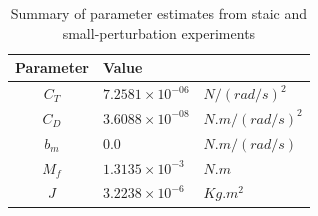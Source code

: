 \begin{table}[H]
    \centering
    \begin{tabular}{c l l}
        \hline \hline
        Parameter & Value & \\ \hline \hline
        $C_T$ & $7.2581 \times 10^{-06}$ & $N/(rad/s)^2$  \\
        $C_D$ & $3.6088 \times 10^{-08}$ & $N.m/(rad/s)^2$ \\
        $b_m$ & $0.0$                    & $N.m/(rad/s)$\\
        $M_f$ & $1.3135 \times 10^{-3}$  & $N.m$\\
        $J$   & $3.2238 \times 10^{-6}$  & $Kg .m^2$ \\\hline \hline
    \end{tabular}
    \caption{Summary of parameter estimates from staic and small-perturbation experiments}
\end{table}
